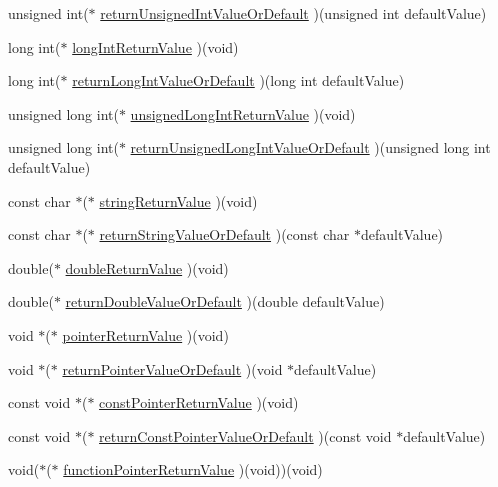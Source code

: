 \begin{DoxyCompactItemize}
\item 
unsigned int($\ast$ \hyperlink{struct_s_mock_support__c_a5bcd1d17f1468d2d48778c42c05a222a}{return\+Unsigned\+Int\+Value\+Or\+Default} )(unsigned int default\+Value)
\item 
long int($\ast$ \hyperlink{struct_s_mock_support__c_a1d43b8bf086a5ba30d408e2125d11839}{long\+Int\+Return\+Value} )(void)
\item 
long int($\ast$ \hyperlink{struct_s_mock_support__c_a70a97eb5b9ca3623f7ae131d427932f3}{return\+Long\+Int\+Value\+Or\+Default} )(long int default\+Value)
\item 
unsigned long int($\ast$ \hyperlink{struct_s_mock_support__c_a5dab94d3a7f6424d399581cf4f0f6152}{unsigned\+Long\+Int\+Return\+Value} )(void)
\item 
unsigned long int($\ast$ \hyperlink{struct_s_mock_support__c_aeb93f4fd4eedf7c83d4bdf04eab48e3c}{return\+Unsigned\+Long\+Int\+Value\+Or\+Default} )(unsigned long int default\+Value)
\item 
const char $\ast$($\ast$ \hyperlink{struct_s_mock_support__c_aefdb35b7b60e7b4cbbc8205661f8ecae}{string\+Return\+Value} )(void)
\item 
const char $\ast$($\ast$ \hyperlink{struct_s_mock_support__c_a57df1d8b45c09709b1d15c3213ca86ba}{return\+String\+Value\+Or\+Default} )(const char $\ast$default\+Value)
\item 
double($\ast$ \hyperlink{struct_s_mock_support__c_a7ecb3db593fac63b35159a89a7dfeed2}{double\+Return\+Value} )(void)
\item 
double($\ast$ \hyperlink{struct_s_mock_support__c_af0c6afe5e9c03b93b3f636894f06f7fd}{return\+Double\+Value\+Or\+Default} )(double default\+Value)
\item 
void $\ast$($\ast$ \hyperlink{struct_s_mock_support__c_abacba40fdd32e5aed923df2a2ad4bd84}{pointer\+Return\+Value} )(void)
\item 
void $\ast$($\ast$ \hyperlink{struct_s_mock_support__c_a5ea57c5c895836ca7b36211167811712}{return\+Pointer\+Value\+Or\+Default} )(void $\ast$default\+Value)
\item 
const void $\ast$($\ast$ \hyperlink{struct_s_mock_support__c_a1794c81a61ac14c7be1f2acfd000611f}{const\+Pointer\+Return\+Value} )(void)
\item 
const void $\ast$($\ast$ \hyperlink{struct_s_mock_support__c_addb8be61d99e230985589991a3789da2}{return\+Const\+Pointer\+Value\+Or\+Default} )(const void $\ast$default\+Value)
\item 
void($\ast$($\ast$ \hyperlink{struct_s_mock_support__c_a808d27a78eeec5e62fe36759b8da147b}{function\+Pointer\+Return\+Value} )(void))(void)

\end{DoxyCompactItemize}
